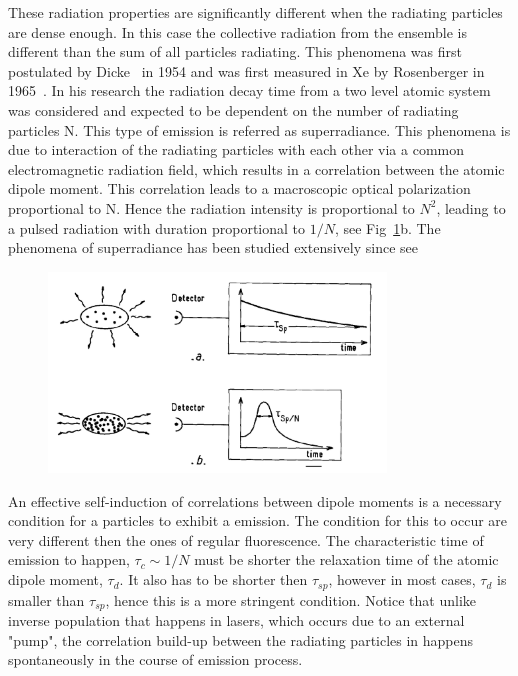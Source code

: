 These radiation properties are significantly different when the radiating particles are dense enough. In this case the collective radiation from  the ensemble is different than the sum of all particles radiating. This phenomena was first postulated by Dicke~\cite{DickeSR} in 1954 and was first measured in Xe by Rosenberger in 1965~\cite{FirstMeasure}. In his research the radiation decay time from a two level atomic system was considered and expected to be dependent on the number of radiating particles N. This type of emission is referred as superradiance. This phenomena is due to interaction of the radiating particles with each other via a common electromagnetic radiation field, which results in a correlation between the atomic dipole moment. This correlation leads to a macroscopic optical polarization proportional to N. Hence the radiation intensity is proportional to $N^2$, leading to a pulsed radiation with duration proportional to $1/N$, see Fig~\ref{fig:emissionType}b. The phenomena of superradiance has been studied extensively since see~\cite{Gross1982301,benedict1996super}  
\begin{figure}[t!]
	\centering
	\includegraphics[width=0.8\textwidth]{figs/emissionTypes.png}
	\label{fig:emissionType}
\end{figure}


An effective self-induction of correlations between dipole moments is a necessary condition for a particles to exhibit a \superradiance emission. The condition for this to occur are very different then the ones of regular fluorescence. The characteristic time of \superradiance emission to happen, $\tau_c \sim 1/N $ must be shorter the relaxation time of the atomic dipole moment, $\tau_d$. It also has to be shorter then $\tau_{sp}$, however in most cases, $\tau_{d}$ is smaller than $\tau_{sp}$, hence this is a more stringent condition. Notice that unlike inverse population that happens in lasers, which occurs due to an external "pump", the correlation build-up between the radiating particles in \superradiance happens spontaneously in the course of emission process.

